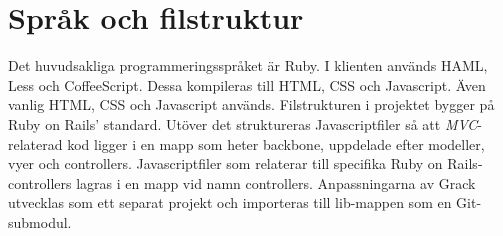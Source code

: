 \section{Språk och filstruktur}
Det huvudsakliga programmeringsspråket är Ruby. I klienten används HAML, Less och CoffeeScript. Dessa kompileras till HTML, CSS och Javascript. Även vanlig HTML, CSS och Javascript används.
Filstrukturen i projektet bygger på Ruby on Rails’ standard. Utöver det struktureras Javascriptfiler så att \emph{MVC}-relaterad kod ligger i en mapp som heter backbone, uppdelade efter modeller, vyer och controllers. Javascriptfiler som relaterar till specifika Ruby on Rails-controllers lagras i en mapp vid namn controllers. 
Anpassningarna av Grack utvecklas som ett separat projekt och importeras till lib-mappen som en Git-submodul.
